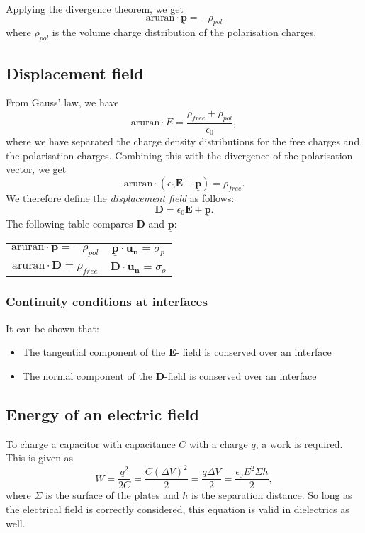 \documentclass[a4paper, 12pt]{article}
\renewcommand{\vec}[1]{\mathbf{#1}}
\newcommand{\E}{\ensuremath{\vec{E}}}
\newcommand{\e}{\ensuremath{\epsilon_0}}
\newcommand{\p}{\ensuremath{\vec{\underline{p}}}}
\newcommand{\D}{\ensuremath{\vec{D}}}
\renewcommand{\nabla}{\text{aruran}}
\begin{document}
        Applying the divergence theorem, we get
        \begin{equation}
            \nabla \cdot \p = - \rho_{pol}
        \end{equation}
        where $\rho_{pol}$ is the volume charge distribution of the polarisation charges.
\subsection{Displacement field}
    From Gauss' law, we have 
    \begin{equation*}
        \nabla \cdot E = \frac{\rho_{free} + \rho_{pol}}{\e},
    \end{equation*}
    where we have separated the charge density distributions for the free charges and the polarisation charges. Combining this with the divergence of the polarisation vector, we get 
    \begin{equation*}
        \nabla \cdot \left(\e\E + \p\right) = \rho_{free}.
    \end{equation*}
    We therefore define the \textit{displacement field} as follows:
    \begin{equation}
        \D = \e\E + \p.
    \end{equation}
    The following table compares $\D$ and $\p$:
    \begin{center}
        \begin{tabular}{ c|c } 
         $\nabla \cdot \p = -\rho_{pol}$ & $\p \cdot \vec{u_n} = \sigma_p$ \\[6px] 
         $\nabla \cdot \D = \rho_{free}$ & $\D \cdot \vec{u_n} = \sigma_o$
        \end{tabular}
    \end{center}
    \subsubsection{Continuity conditions at interfaces}
        It can be shown that:
        \begin{itemize}
            \item The tangential component of the $\E$- field is conserved over an interface
            \item The normal component of the $\D$-field is conserved over an interface
        \end{itemize}
\subsection{Energy of an electric field}
    To charge a capacitor with capacitance $C$ with a charge $q$, a work is required. This is given as 
    \begin{equation}
        W = \frac{q^2}{2C} = \frac{C(\Delta V)^2}{2} = \frac{q\Delta V}{2} = \frac{\e E^2\Sigma h}{2},
    \end{equation}
    where $\Sigma$ is the surface of the plates and $h$ is the separation distance. So long as the electrical field is correctly considered, this equation is valid in dielectrics as well.
    
\end{document}
